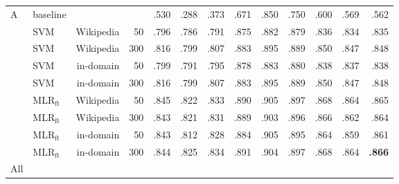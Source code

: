 \documentclass[epsfig,a4paper,12pt,titlepage]{book}
\newcommand{\mlr}{MLR$_\text{ft}$\xspace}
\begin{document}
\begin{table}[H]
\begin{center}
\begin{adjustbox}{width=\textwidth}
\begin{tabular}{|llr@{\hskip 0.3in}rrrr|rrr|rrr|}
                 \hline
\multirow{9}{*}{A}
                & baseline &    &  & .530  & .288  & .373  & .671  & .850  & .750  & .600 & .569 & .562                            \\
                 & SVM  & Wikipedia    & 50   & .796  & .786  & .791  & .875  & .882  & .879  & .836 & .834 & .835         \\
                 & SVM  & Wikipedia    & 300  & .816  & .799  & .807  & .883  & .895  & .889  & .850 & .847 & .848          \\
                & SVM      & in-domain   & 50   & .799  & .791  & .795  & .878  & .883  & .880  & .838 & .837 & .838         \\
                & SVM      & in-domain   & 300  &  .816  & .799  & .807  & .883 & .895  & .889  & .850 & .847 & .848                          \\
                & \mlr & Wikipedia & 50   & .845  & .822  & .833  & .890  & .905  & .897  & .868 & .864 & .865                  \\
                & \mlr & Wikipedia & 300  & .843  & .821  & .831  & .889  & .903  & .896  & .866 & .862 & .864                         \\
                & \mlr & in-domain & 50   & .843  & .812  & .828  & .884  & .905  & .895  & .864 & .859 & .861                  \\
                 & \mlr & in-domain & 300  & .844  & .825  & .834  & .891  & .904  & .897  & .868 & .864 & \textbf{.866}          \\
                 
            \hline
            \hline
\multirow{9}{*}{All}  


\end{tabular}
\end{adjustbox}
\end{center}
\end{table}
\end{document}

